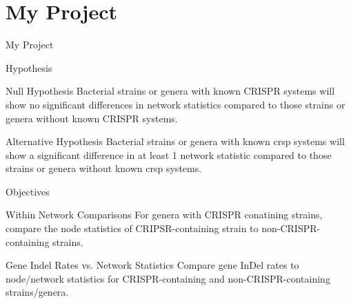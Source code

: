 \documentclass[dvipsnames]{beamer}
\begin{document}
\section{My Project}
\begin{frame}[fragile]{}
    \begin{center}
        \Huge \textcolor{OliveGreen}{My Project}
    \end{center}
\end{frame}
\begin{frame}[fragile]{Hypothesis}
     \begin{block}{Null Hypothesis}
     Bacterial strains or genera with known CRISPR systems will show no significant differences in network statistics compared to those strains or genera without known CRISPR systems.
    \end{block}
     \begin{block}{Alternative Hypothesis}
     Bacterial strains or genera with known \ac{crsp} systems will show a significant difference in at least 1 network statistic compared to those strains or  genera without known \ac{crsp} systems.
    \end{block}
\end{frame}
\begin{frame}[fragile]{Objectives}
     \begin{block}{Within Network Comparisons}
        For genera with CRISPR conatining strains, compare the node statistics of CRIPSR-containing strain to non-CRISPR-containing strains.
    \end{block}
     \begin{block}{Gene Indel Rates vs. Network Statistics}
        Compare gene InDel rates to node/network statistics for CRISPR-containing and non-CRISPR-containing strains/genera.
    \end{block}
\end{frame}
\end{document}
